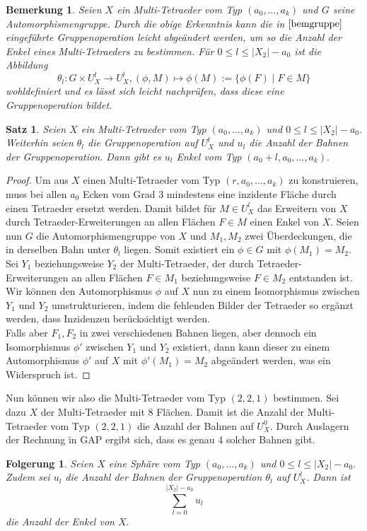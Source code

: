 \documentclass[12pt,titlepage,twoside,cleardoublepage]{article}
\theoremstyle{nummermitklammern}
\newtheorem{folgerung}[temp]{Folgerung}
\newtheorem{bemerkung}[temp]{Bemerkung}
\newtheorem{satz}[temp]{Satz}
\newtheorem{folgerung}[zahl]{Folgerung}
\newtheorem{bemerkung}[zahl]{Bemerkung}
\newtheorem{satz}[zahl]{Satz}
\numberwithin{equation}{section}
\begin{document}
\begin{bemerkung}
Seien $X$ ein Multi-Tetraeder vom Typ $(a_0,\ldots ,a_k)$ und $G$ seine Automorphismengruppe.
Durch die obige Erkenntnis kann die in $\Cref{bemgruppe}$ eingeführte Gruppenoperation leicht abgeändert werden, um so die Anzahl der Enkel eines Multi-Tetraeders zu bestimmen. Für $0\leq l\leq \vert X_2 \vert -a_0$ ist die Abbildung
\[
\theta_l: G\times U_X^l \to U_X^l, (\phi, M)\mapsto \phi(M):=\{\phi(F)\mid F\in M\}
\] 
wohldefiniert und es lässt sich leicht nachprüfen, dass diese eine Gruppenoperation bildet.
\end{bemerkung}
\begin{satz}
Seien $X$ ein Multi-Tetraeder vom Typ $(a_0,\ldots,a_k)$ und $0\leq l\leq \vert X_2\vert -a_0.$ Weiterhin seien $\theta_l$ die Gruppenoperation auf $U_X^l$ und $u_l$ die Anzahl der Bahnen der Gruppenoperation. Dann gibt es $u_l$ Enkel vom Typ $(a_0+l,a_0,\ldots,a_k).$
\end{satz}
\begin{proof}
Um aus $X$ einen Multi-Tetraeder vom Typ $(r,a_0,\ldots,a_k)$ zu konstruieren, muss bei allen $a_0$ Ecken vom Grad 3 mindestens eine inzidente Fläche durch einen Tetraeder ersetzt werden. Damit bildet für $M\in U_X^l$ das Erweitern von $X$ durch Tetraeder-Erweiterungen an allen Flächen $F\in M$ einen Enkel von $X$. Seien nun $G$ die Automorphismengruppe von $X$ und $M_1,M_2$ zwei Überdeckungen, die in derselben Bahn unter $\theta_l$ liegen. Somit existiert ein $\phi \in G$ mit $\phi(M_1)=M_2.$ Sei $Y_1$ beziehungsweise $Y_2$ der Multi-Tetraeder, der durch Tetraeder-Erweiterungen an allen Flächen $F\in M_1$ beziehungsweise $F \in M_2$ entstanden ist. Wir können den Automorphismus $\phi$ auf $X$ nun zu einem Isomorphismus zwischen $Y_1$ und $Y_2$ umstrukturieren, indem die fehlenden Bilder der Tetraeder so ergänzt werden, dass Inzidenzen berücksichtigt werden. \\
Falls aber $F_1,F_2$ in zwei verschiedenen Bahnen liegen, aber dennoch ein Isomorphismus $\phi'$ zwischen $Y_1$ und $Y_2$ existiert, dann kann dieser zu einem Automorphismus $\phi'$ auf $X$ mit $\phi'(M_1)=M_2$ abgeändert werden, was ein Widerspruch ist.
\end{proof}
Nun können wir also die Multi-Tetraeder vom Typ $(2,2,1)$ bestimmen. Sei dazu $X$ der Multi-Tetraeder mit 8 Flächen.
Damit ist die Anzahl der Multi-Tetraeder vom Typ $(2,2,1)$ die Anzahl der Bahnen auf $U^0_X.$ Durch Auslagern der Rechnung in GAP ergibt sich, dass es genau 4 solcher Bahnen gibt.
\begin{folgerung}
Seien $X$ eine Sphäre vom Typ $(a_0,\ldots, a_k)$ und $0\leq l\leq \vert X_2\vert -a_0.$ Zudem sei $u_l$ die Anzahl der Bahnen der Gruppenoperation $\theta_l$ auf $U_X^l$. Dann ist 
\[
\sum_{l=0}^{\vert X_2\vert -a_0} u_l
\] die Anzahl der Enkel von $X.$
\end{folgerung}
\end{document}
